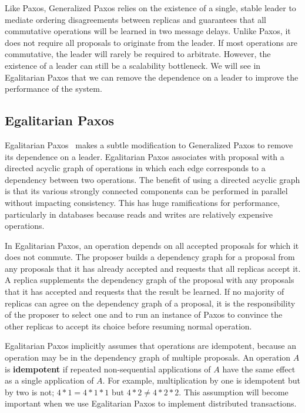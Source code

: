 \documentclass{article}
\begin{document}
    Like Paxos, Generalized Paxos relies on the existence of a single, stable leader to mediate
    ordering disagreements between replicas and guarantees that all commutative operations will be
    learned in two message delays. Unlike Paxos, it does not require all proposals to originate from
    the leader. If most operations are commutative, the leader will rarely be required to arbitrate.
    However, the existence of a leader can still be a scalability bottleneck. We will see in
    Egalitarian Paxos that we can remove the dependence on a leader to improve the performance of the
    system.

    \subsection{Egalitarian Paxos}
    Egalitarian Paxos~\cite{epaxos} makes a subtle modification to Generalized Paxos to remove its
    dependence on a leader. Egalitarian Paxos associates with proposal with a directed acyclic graph
    of operations in which each edge corresponds to a dependency between two operations. The benefit
    of using a directed acyclic graph is that its various strongly connected components can be
    performed in parallel without impacting consistency. This has huge ramifications for performance,
    particularly in databases because reads and writes are relatively expensive operations.

    In Egalitarian Paxos, an operation depends on all accepted proposals for which it does not
    commute. The proposer builds a dependency graph for a proposal from any proposals that it has
    already accepted and requests that all replicas accept it. A replica supplements the dependency
    graph of the proposal with any proposals that it has accepted and requests that the result be
    learned. If no majority of replicas can agree on the dependency graph of a proposal, it is the
    responsibility of the proposer to select one and to run an instance of Paxos to convince the
    other replicas to accept its choice before resuming normal operation.

    Egalitarian Paxos implicitly assumes that operations are idempotent, because an operation may be
    in the dependency graph of multiple proposals. An operation $A$ is \textbf{idempotent} if repeated
    non-sequential applications of $A$ have the same effect as a single application of $A$. For
    example, multiplication by one is idempotent but by two is not; $4 * 1 = 4 * 1 * 1$ but
    $4 * 2 \ne 4 * 2 * 2$. This assumption will become important when we use Egalitarian Paxos to
    implement distributed transactions.
\end{document}
